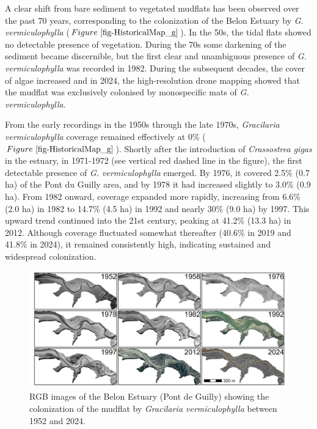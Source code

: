 \documentclass[
  letterpaper,
  11pt,
  english,
  singlespacing,
  headsepline]{MastersDoctoralThesis}
\begin{document}
\begin{spacing}{1.5}
A clear shift from bare sediment to vegetated mudflats has been observed
over the past 70 years, corresponding to the colonization of the Belon
Estuary by \emph{G. vermiculophylla}
(\(Figure~\ref{fig-HistoricalMap_g}\)). In the 50s, the tidal flats
showed no detectable presence of vegetation. During the 70s some
darkening of the sediment became discernible, but the first clear and
unambiguous presence of \emph{G. vermiculophylla} was recorded in 1982.
During the subsequent decades, the cover of algae increased and in 2024,
the high-resolution drone mapping showed that the mudflat was
exclusively colonised by monospecific mats of \emph{G. vermiculophylla}.

From the early recordings in the 1950s through the late 1970s,
\emph{Gracilaria vermiculophylla} coverage remained effectively at 0\%
(\(Figure~\ref{fig-HistoricalMap_g}\)). Shortly after the introduction
of \emph{Crassostrea gigas} in the estuary, in 1971-1972 (see vertical
red dashed line in the figure), the first detectable presence of
\emph{G. vermiculophylla} emerged. By 1976, it covered 2.5\% (0.7 ha) of
the Pont du Guilly area, and by 1978 it had increased slightly to 3.0\%
(0.9 ha). From 1982 onward, coverage expanded more rapidly, increasing
from 6.6\% (2.0 ha) in 1982 to 14.7\% (4.5 ha) in 1992 and nearly 30\%
(9.0 ha) by 1997. This upward trend continued into the 21st century,
peaking at 41.2\% (13.3 ha) in 2012. Although coverage fluctuated
somewhat thereafter (40.6\% in 2019 and 41.8\% in 2024), it remained
consistently high, indicating sustained and widespread colonization.

\newpage

\begin{landscape}
\begin{figure}[ht]
    \centering
    \includegraphics[width=\linewidth]{Chapter4/Figs/Historical_maps.png}
    \caption{\label{fig-HistoricalMap_g}RGB images of the Belon Estuary (Pont de Guilly) showing the colonization of the mudflat by \textit{Gracilaria vermiculophylla} between 1952 and 2024.}
\end{figure}


\end{landscape}
\end{spacing}
\end{document}
